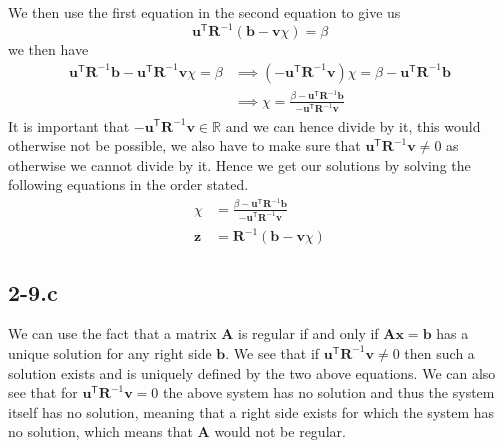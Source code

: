 \documentclass{article}
\begin{document}
\noindent We then use the first equation in the second equation to give us
\begin{equation*}    \mathbf{u}^{\mathsf{T}}\mathbf{R}^{-1}\left(\mathbf{b} - \mathbf{v}\chi\right) = \beta
\end{equation*}
we then have 
\begin{align*}    \mathbf{u}^{\mathsf{T}}\mathbf{R}^{-1}\mathbf{b} - \mathbf{u}^{\mathsf{T}}\mathbf{R}^{-1}\mathbf{v}\chi= \beta &\implies  \left(- \mathbf{u}^{\mathsf{T}}\mathbf{R}^{-1}\mathbf{v}\right)\chi= \beta - \mathbf{u}^{\mathsf{T}}\mathbf{R}^{-1}\mathbf{b} \\
&\implies \chi =  \frac{\beta - \mathbf{u}^{\mathsf{T}}\mathbf{R}^{-1}\mathbf{b}}{- \mathbf{u}^{\mathsf{T}}\mathbf{R}^{-1}\mathbf{v}}
\end{align*}
It is important that $- \mathbf{u}^{\mathsf{T}}\mathbf{R}^{-1}\mathbf{v} \in \mathbb{R}$ and we can hence divide by it, this would otherwise not be possible, we also have to make sure that $\mathbf{u}^{\mathsf{T}}\mathbf{R}^{-1}\mathbf{v}  \neq 0$ as otherwise we cannot divide by it. Hence we get our solutions by solving the following equations in the order stated.
\begin{align*}
    \chi &=  \frac{\beta - \mathbf{u}^{\mathsf{T}}\mathbf{R}^{-1}\mathbf{b}}{- \mathbf{u}^{\mathsf{T}}\mathbf{R}^{-1}\mathbf{v}} \\[1mm]
    \mathbf{z}  &= \mathbf{R}^{-1}\left(\mathbf{b} - \mathbf{v}\chi\right)
\end{align*}
\subsection*{2-9.c}
We can use the fact that a matrix $\mathbf{A}$ is regular if and only if $\mathbf{A}\mathbf{x} = \mathbf{b}$ has a unique solution for any right side $\mathbf{b}$. We see that if $\mathbf{u}^{\mathsf{T}}\mathbf{R}^{-1}\mathbf{v}  \neq 0$ then such a solution exists and is uniquely defined by the two above equations. We can also see that for $\mathbf{u}^{\mathsf{T}}\mathbf{R}^{-1}\mathbf{v} = 0$ the above system has no solution and thus the system itself has no solution, meaning that a right side exists for which the system has no solution, which means that $\mathbf{A}$ would not be regular. \\[2mm]
\end{document}
